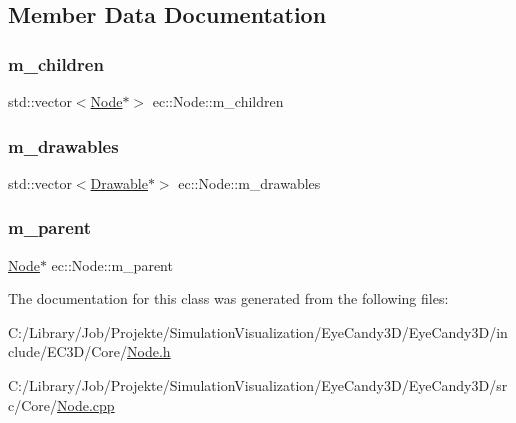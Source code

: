 \subsection{Member Data Documentation}
\mbox{\label{classec_1_1_node_a648e1758013c7fc5899cbff2f8fe41fa}} 
\subsubsection{\texorpdfstring{m\+\_\+children}{m\_children}}
{\footnotesize\ttfamily std\+::vector$<$\mbox{\hyperlink{classec_1_1_node}{Node}}$\ast$$>$ ec\+::\+Node\+::m\+\_\+children\hspace{0.3cm}{\ttfamily [protected]}}

\mbox{\label{classec_1_1_node_aa9f624971a4906674148117ba4442c01}} 
\subsubsection{\texorpdfstring{m\+\_\+drawables}{m\_drawables}}
{\footnotesize\ttfamily std\+::vector$<$\mbox{\hyperlink{classec_1_1_drawable}{Drawable}}$\ast$$>$ ec\+::\+Node\+::m\+\_\+drawables\hspace{0.3cm}{\ttfamily [protected]}}

\mbox{\label{classec_1_1_node_a9f5373bd3ba5bfed53894223adcfe791}} 
\subsubsection{\texorpdfstring{m\+\_\+parent}{m\_parent}}
{\footnotesize\ttfamily \mbox{\hyperlink{classec_1_1_node}{Node}}$\ast$ ec\+::\+Node\+::m\+\_\+parent\hspace{0.3cm}{\ttfamily [protected]}}



The documentation for this class was generated from the following files\+:\begin{DoxyCompactItemize}
\item 
C\+:/\+Library/\+Job/\+Projekte/\+Simulation\+Visualization/\+Eye\+Candy3\+D/\+Eye\+Candy3\+D/include/\+E\+C3\+D/\+Core/\mbox{\hyperlink{_node_8h}{Node.\+h}}\item 
C\+:/\+Library/\+Job/\+Projekte/\+Simulation\+Visualization/\+Eye\+Candy3\+D/\+Eye\+Candy3\+D/src/\+Core/\mbox{\hyperlink{_node_8cpp}{Node.\+cpp}}\end{DoxyCompactItemize}
